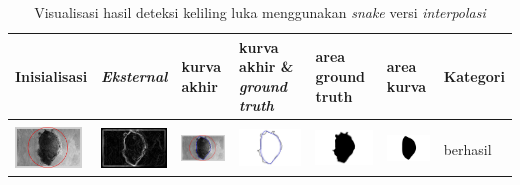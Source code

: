 \begin{table}[H]
	\centering
	\caption{Visualisasi hasil deteksi keliling luka menggunakan \emph{snake} versi \emph{interpolasi}}
	\label{tabel_hasil_2_interp}
	\begin{tabular}{|m{0.7in}|m{0.7in}|m{0.7in}|m{0.7in}|m{0.7in}|m{0.7in}|m{0.7in}|}
		\hline
		\textbf{Inisialisasi} & \textbf{\emph{Eksternal}} & \textbf{kurva akhir} & \textbf{kurva akhir \& \emph{ground truth}}& \textbf{area ground truth} & \textbf{area kurva} & \textbf{Kategori} \\
		\hline
		
		&  &  & & & &  \\
		\includegraphics[width=0.7in]{dataset/dataset_3/luka_hitam/ready/15_interp_init.jpg}&
		\includegraphics[width=0.7in]{dataset/dataset_3/luka_hitam/ready/15_interp_ext.jpg}&
		\includegraphics[width=0.7in]{dataset/dataset_3/luka_hitam/ready/15_interp_result.jpg}&
		\includegraphics[width=0.7in]{dataset/dataset_3/luka_hitam/ready/15_gt_r.jpg}&
		\includegraphics[width=0.7in]{dataset/dataset_3/luka_hitam/ready/15_r.jpg}&
		\includegraphics[width=0.7in]{dataset/dataset_3/luka_hitam/ready/15_interp_r.jpg}&
		berhasil\\
		\hline
		

\end{tabular}
\end{table}
